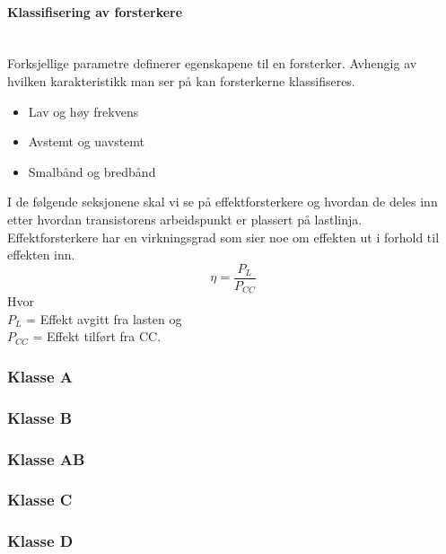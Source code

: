 \paragraph{Klassifisering av forsterkere} \mbox{} \\
Forksjellige parametre definerer egenskapene til en forsterker.
Avhengig av hvilken karakteristikk man ser på kan forsterkerne klassifiseres.
\begin{itemize}
\item Lav og høy frekvens
\item Avstemt og uavstemt
\item Smalbånd og bredbånd
\end{itemize}

I de følgende seksjonene skal vi se på effektforsterkere og hvordan de deles inn
etter hvordan transistorens arbeidspunkt er plassert på lastlinja.
\\
Effektforsterkere har en virkningsgrad som sier noe om effekten ut
i forhold til effekten inn.
$$\eta = \frac{P_L}{P_{CC}} $$
Hvor \\
 $P_L$ = Effekt avgitt fra lasten og \\
$P_{CC}$ = Effekt tilført fra CC.

\subsubsection{Klasse A}


\subsubsection{Klasse B}


\subsubsection{Klasse AB}


\subsubsection{Klasse C}


\subsubsection{Klasse D}

